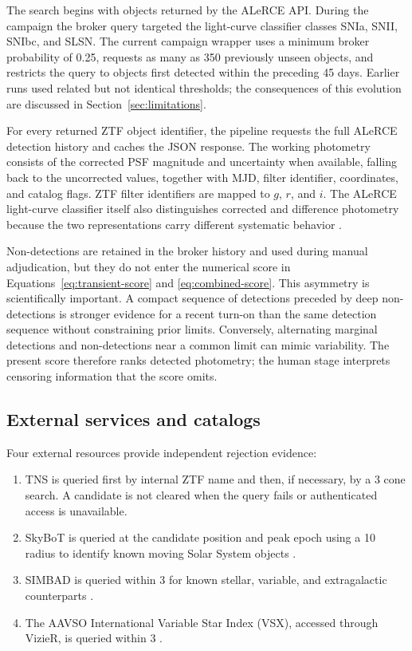 \documentclass[11pt]{article}
\begin{document}
The search begins with objects returned by the ALeRCE API. During the campaign the broker query targeted the light-curve classifier classes SNIa, SNII, SNIbc, and SLSN. The current campaign wrapper uses a minimum broker probability of 0.25, requests as many as 350 previously unseen objects, and restricts the query to objects first detected within the preceding 45 days. Earlier runs used related but not identical thresholds; the consequences of this evolution are discussed in Section~\ref{sec:limitations}.

For every returned ZTF object identifier, the pipeline requests the full ALeRCE detection history and caches the JSON response. The working photometry consists of the corrected PSF magnitude and uncertainty when available, falling back to the uncorrected values, together with MJD, filter identifier, coordinates, and catalog flags. ZTF filter identifiers are mapped to $g$, $r$, and $i$. The ALeRCE light-curve classifier itself also distinguishes corrected and difference photometry because the two representations carry different systematic behavior \citep{sanchezsaez2021}.

Non-detections are retained in the broker history and used during manual adjudication, but they do not enter the numerical score in Equations~\ref{eq:transient-score} and \ref{eq:combined-score}. This asymmetry is scientifically important. A compact sequence of detections preceded by deep non-detections is stronger evidence for a recent turn-on than the same detection sequence without constraining prior limits. Conversely, alternating marginal detections and non-detections near a common limit can mimic variability. The present score therefore ranks detected photometry; the human stage interprets censoring information that the score omits.

\subsection{External services and catalogs}

Four external resources provide independent rejection evidence:

\begin{enumerate}
  \item TNS is queried first by internal ZTF name and then, if necessary, by a \SI{3}{\arcsec} cone search. A candidate is not cleared when the query fails or authenticated access is unavailable.
  \item SkyBoT is queried at the candidate position and peak epoch using a \SI{10}{\arcsec} radius to identify known moving Solar System objects \citep{berthier2006}.
  \item SIMBAD is queried within \SI{3}{\arcsec} for known stellar, variable, and extragalactic counterparts \citep{wenger2000}.
  \item The AAVSO International Variable Star Index (VSX), accessed through VizieR, is queried within \SI{3}{\arcsec} \citep{ochsenbein2000,watson2006}.
\end{enumerate}
\end{document}
